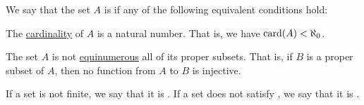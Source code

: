 \begin{definition}\label{def:set_finiteness}
  We say that the set \( A \) is  if any of the following equivalent conditions hold:
  \begin{thmenum}
     The \hyperref[thm:cardinality_existence]{cardinality} of \( A \) is a natural number. That is, we have \( \operatorname{card}(A) < \aleph_0 \).

     The set \( A \) is not \hyperref[def:equinumerosity]{equinumerous} all of its proper subsets. That is, if \( B \) is a proper subset of \( A \), then no function from \( A \) to \( B \) is injective.
  \end{thmenum}

  If a set is not finite, we say that it is . If a set does not satisfy , we say that it is .
\end{definition}
